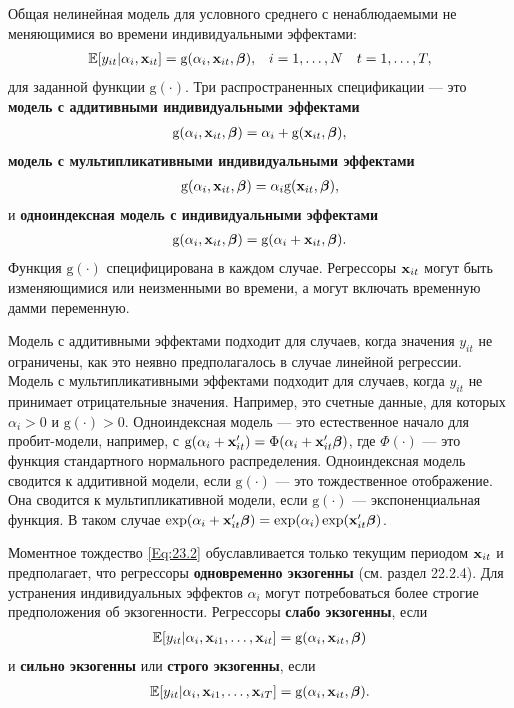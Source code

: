 Общая нелинейная модель для условного среднего с ненаблюдаемыми не меняющимися во времени индивидуальными эффектами:
\begin{align}
&\mathbb{E}[y_{it}|\alpha_i, \mathbf{x}_{it}]=\mathrm g(\alpha_i, \mathbf{x}_{it}, \bm{\beta}),
& i=1, \dots, N &
&t=1,  \dots, T,
\label{Eq:23.2}
\end{align}
для заданной функции $\mathrm g(\cdot)$. Три распространенных спецификации  --- это \textbf{модель с аддитивными индивидуальными эффектами}
\begin{align}
\mathrm g(\alpha_i, \mathbf{x}_{it}, \bm{\beta})=\alpha_i+ \mathrm g(\mathbf{x}_{it}, \bm{\beta}),
\label{Eq:23.3}
\end{align}
\textbf{модель с мультипликативными индивидуальными эффектами}
\begin{align}
\mathrm g(\alpha_i, \mathbf{x}_{it}, \bm{\beta})=\alpha_i \mathrm g(\mathbf{x}_{it}, \bm{\beta}),
\label{Eq:23.4}
\end{align}
и \textbf{одноиндексная модель с индивидуальными эффектами}
\begin{align}
\mathrm g(\alpha_i, \mathbf{x}_{it}, \bm{\beta})= \mathrm g(\alpha_i+\mathbf{x}_{it}, \bm{\beta}).
\label{Eq:23.5}
\end{align}
Функция $\mathrm g(\cdot)$ специфицирована в каждом случае. Регрессоры $\mathbf{x}_{it}$ могут быть изменяющимися или неизменными во времени, а могут включать временную дамми переменную.

Модель с аддитивными эффектами подходит для случаев, когда значения $y_{it}$  не ограничены, как это неявно предполагалось в случае линейной регрессии. Модель с мультипликативными эффектами подходит для случаев, когда $y_{it}$ не принимает отрицательные значения. Например, это счетные данные, для которых $\alpha_i>0$ и  $\mathrm g(\cdot)>0$. Одноиндексная модель --- это естественное начало для пробит-модели, например, с $\mathrm g(\alpha_i+\mathbf{x}'_{it})=\Phi(\alpha_i+\mathbf{x}'_{it}\bm{\beta})$, где $\Phi(\cdot)$ --- это функция стандартного нормального распределения. Одноиндексная модель сводится к аддитивной модели, если $\mathrm g(\cdot)$ --- это тождественное отображение. 
Она сводится к мультипликативной модели, если $\mathrm g(\cdot)$  --- экспоненциальная функция. В таком случае $\exp (\alpha_i+\mathbf{x}'_{it}\bm{\beta})=\exp (\alpha_i)\exp (\mathbf{x}'_{it}\bm{\beta})$.

Моментное тождество \ref{Eq:23.2} обуславливается только текущим периодом $\mathbf{x}_{it}$ и предполагает, что регрессоры \textbf{одновременно экзогенны} (см. раздел 22.2.4). Для устранения индивидуальных эффектов $\alpha_i$ могут потребоваться более строгие предположения об экзогенности. Регрессоры \textbf{слабо экзогенны}, если 
\begin{align}
\mathbb{E}[y_{it}|\alpha_i, \mathbf{x}_{i1}, \dots, \mathbf{x}_{it}]=\mathrm g(\alpha_i, \mathbf{x}_{it},\bm{\beta})
\label{Eq:23.6}
\end{align}
и \textbf{сильно экзогенны} или \textbf{строго экзогенны}, если
\begin{align}
\mathbb{E}[y_{it}|\alpha_i, \mathbf{x}_{i1}, \dots, \mathbf{x}_{iT}]=\mathrm g(\alpha_i, \mathbf{x}_{it},\bm{\beta}).
\label{Eq:23.7}
\end{align}

